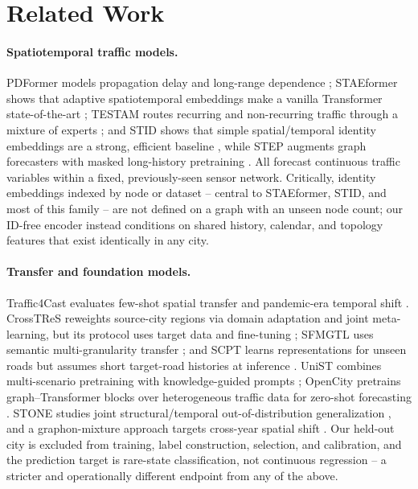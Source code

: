 \section{Related Work}
\label{sec:related}

\paragraph{Spatiotemporal traffic models.} PDFormer models propagation delay and long-range
dependence \citep{jiang2023pdformer}; STAEformer shows that adaptive spatiotemporal embeddings make
a vanilla Transformer state-of-the-art \citep{liu2023staeformer}; TESTAM routes recurring and
non-recurring traffic through a mixture of experts \citep{lee2024testam}; and STID shows that simple
spatial/temporal identity embeddings are a strong, efficient baseline \citep{shao2022stid}, while
STEP augments graph forecasters with masked long-history pretraining \citep{shao2022step}. All
forecast continuous traffic variables within a fixed, previously-seen sensor network. Critically,
identity embeddings indexed by node or dataset -- central to STAEformer, STID, and most of this
family -- are not defined on a graph with an unseen node count; our ID-free encoder instead
conditions on shared history, calendar, and topology features that exist identically in any city.

\paragraph{Transfer and foundation models.} Traffic4Cast evaluates few-shot spatial transfer and
pandemic-era temporal shift \citep{eichenberger2022traffic4cast21,neun2022traffic4cast22}.
CrossTReS reweights source-city regions via domain adaptation and joint meta-learning, but its
protocol uses target data and fine-tuning \citep{jin2022crosstres}; SFMGTL uses semantic
multi-granularity transfer \citep{chen2024sfmgtl}; and SCPT learns representations for unseen roads
but assumes short target-road histories at inference \citep{prabowo2024scpt}. UniST combines
multi-scenario pretraining with knowledge-guided prompts \citep{yuan2024unist}; OpenCity pretrains
graph--Transformer blocks over heterogeneous traffic data for zero-shot forecasting
\citep{li2025opencity}. STONE studies joint structural/temporal out-of-distribution generalization
\citep{wang2024stone}, and a graphon-mixture approach targets cross-year spatial shift
\citep{wang2024spatialshift}. Our held-out city is excluded from training, label construction,
selection, and calibration, and the prediction target is rare-state classification, not continuous
regression -- a stricter and operationally different endpoint from any of the above.

